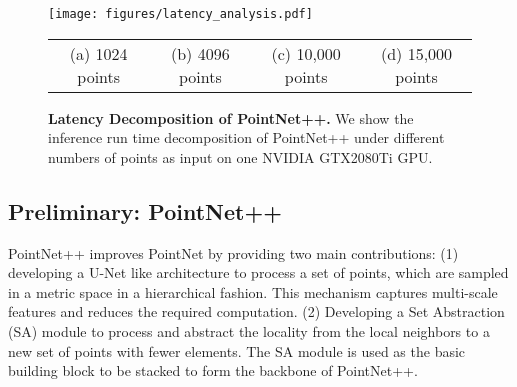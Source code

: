 \documentclass{article}
\begin{document}
\begin{figure*}[t]
\begin{center}
\texttt{[image: figures/latency\_analysis.pdf]}
\end{center}
\vspace{-3mm}
\setlength{\tabcolsep}{7mm}
\begin{tabular}{cccc}
(a) 1024 points & 
(b) 4096 points & 
(c) 10,000 points &
(d) 15,000 points 
\end{tabular}
\caption{\textbf{Latency Decomposition of PointNet++.} We show the inference run time decomposition of PointNet++ under different numbers of points as input on one NVIDIA GTX2080Ti GPU. 
}
\label{fig:latency_pointnet++}
\end{figure*}

\subsection{Preliminary: PointNet++} \label{sec:pointnet++}
PointNet++ \cite{Qi2017PointNetDH} improves PointNet \cite{Qi2017PointNetDL} by providing two main contributions: 
(1) developing a U-Net \cite{Ronneberger15unet} like architecture to process a set of points, which are sampled in a metric space in a hierarchical fashion. This mechanism captures multi-scale features and reduces the required computation.
(2) Developing a Set Abstraction (SA) module to process and abstract the locality from the local neighbors to a new set of points with fewer elements. The SA module is used as the basic building block to be stacked to form the backbone of PointNet++. 
\end{document}
